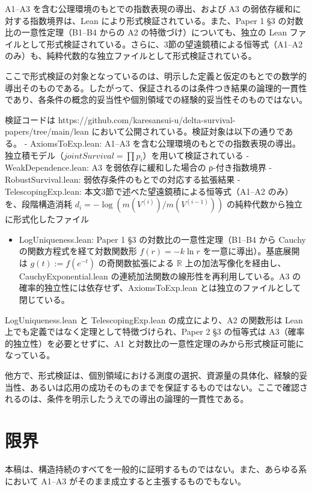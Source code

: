 \documentclass[12pt,a4paper]{article}
\begin{document}
A1--A3 を含む公理環境のもとでの指数表現の導出、および A3 の弱依存緩和に対する指数境界は、Lean により形式検証されている。また、Paper 1 §3 の対数比の一意性定理（B1--B4 からの A2 の特徴づけ）についても、独立の Lean ファイルとして形式検証されている。さらに、3節の望遠鏡積による恒等式（A1--A2 のみ）も、純粋代数的な独立ファイルとして形式検証されている。

ここで形式検証の対象となっているのは、明示した定義と仮定のもとでの数学的導出そのものである。したがって、保証されるのは条件つき結果の論理的一貫性であり、各条件の概念的妥当性や個別領域での経験的妥当性そのものではない。

検証コードは https://github.com/karesansui-u/delta-survival-papers/tree/main/lean において公開されている。検証対象は以下の通りである。 - AxiomsToExp.lean: A1--A3 を含む公理環境のもとでの指数表現の導出。独立積モデル（\(jointSurvival = \prod p_{i}\)）を用いて検証されている - WeakDependence.lean: A3 を弱依存に緩和した場合の ρ-付き指数境界 - RobustSurvival.lean: 弱依存条件のもとでの対応する拡張結果 - TelescopingExp.lean: 本文3節で述べた望遠鏡積による恒等式（A1--A2 のみ）を、段階構造消耗 \(d_i = -\log(m(V^{(i)})/m(V^{(i-1)}))\) の純粋代数から独立に形式化したファイル

\begin{itemize}
\tightlist
\item
  LogUniqueness.lean: Paper 1 §3 の対数比の一意性定理（B1--B4 から Cauchy の関数方程式を経て対数関数形 \(f(r) = -k \ln r\) を一意に導出）。基底展開は \(g(t) := f(e^{-t})\) の奇関数拡張による \(\mathbb{R}\) 上の加法写像化を経由し、CauchyExponential.lean の連続加法関数の線形性を再利用している。A3 の確率的独立性には依存せず、AxiomsToExp.lean とは独立のファイルとして閉じている。
\end{itemize}

LogUniqueness.lean と TelescopingExp.lean の成立により、A2 の関数形は Lean 上でも定義ではなく定理として特徴づけられ、Paper 2 §3 の恒等式は A3（確率的独立性）を必要とせずに、A1 と対数比の一意性定理のみから形式検証可能になっている。

他方で、形式検証は、個別領域における測度の選択、資源量の具体化、経験的妥当性、あるいは応用の成功そのものまでを保証するものではない。ここで確認されるのは、条件を明示したうえでの導出の論理的一貫性である。

\section{限界}\label{ux9650ux754c}

本稿は、構造持続のすべてを一般的に証明するものではない。また、あらゆる系において A1--A3 がそのまま成立すると主張するものでもない。
\end{document}
